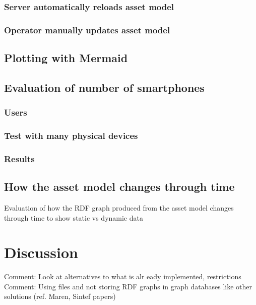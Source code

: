 \documentclass{article}
\begin{document}
\subsubsection{Server automatically reloads asset model}
\subsubsection{Operator manually updates asset model}
\subsection{Plotting with Mermaid}
\subsection{Evaluation of number of smartphones}
\subsubsection{Users}
\subsubsection{Test with many physical devices}
\subsubsection{Results}
\subsection{How the asset model changes through time}
Evaluation of how the RDF graph produced from the asset model changes through time to show static vs dynamic data




\newpage
\section{Discussion}\label{sec:Discussion}
Comment: Look at alternatives to what is alr eady implemented, restrictions
Comment: Using files and not storing RDF graphs in graph databases like other solutions (ref. Maren, Sintef papers)
\end{document}
